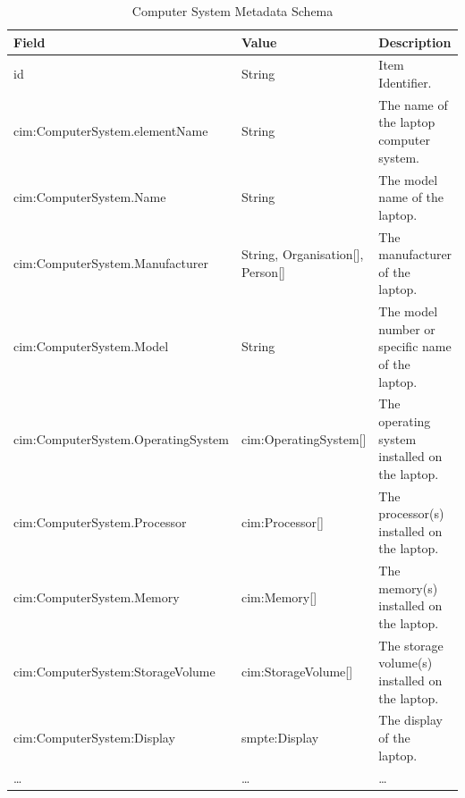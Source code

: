 \begin{longtable}{|p{}|p{}|p{}|}
    \caption{Computer System Metadata Schema} \label{tab:c4-computer} \\
    \hline
    \textbf{Field} & \textbf{Value} & \textbf{Description} \\
    \hline

    \scriptsize id                                    & \scriptsize String                         & \scriptsize Item Identifier. \\
    \hline
    \scriptsize cim:ComputerSystem.elementName        & \scriptsize String                         & \scriptsize The name of the laptop computer system. \\
    \hline
    \scriptsize cim:ComputerSystem.Name               & \scriptsize String                         & \scriptsize The model name of the laptop. \\
    \hline
    \scriptsize cim:ComputerSystem.Manufacturer       & \scriptsize String, \textcolor{uniudColor3}{Organisation}[], \textcolor{uniudColor3}{Person}[]     & \scriptsize The manufacturer of the laptop. \\
    \hline
    \scriptsize cim:ComputerSystem.Model              & \scriptsize String                         & \scriptsize The model number or specific name of the laptop. \\
    \hline
    \scriptsize cim:ComputerSystem.OperatingSystem    & \scriptsize \textcolor{uniudColor3}{cim:OperatingSystem}[]          & \scriptsize The operating system installed on the laptop. \\
    \hline
    \scriptsize cim:ComputerSystem.Processor          & \scriptsize \textcolor{uniudColor3}{cim:Processor}[]                & \scriptsize The processor(s) installed on the laptop. \\
    \hline
    \scriptsize cim:ComputerSystem.Memory             & \scriptsize \textcolor{uniudColor3}{cim:Memory}[]                   & \scriptsize The memory(s) installed on the laptop. \\
    \hline
    \scriptsize cim:ComputerSystem:StorageVolume      & \scriptsize \textcolor{uniudColor3}{cim:StorageVolume}[]            & \scriptsize The storage volume(s) installed on the laptop. \\
    \hline
    \scriptsize cim:ComputerSystem:Display            & \scriptsize \textcolor{uniudColor3}{smpte:Display}                  & \scriptsize The display of the laptop. \\
    \hline
    \scriptsize …                                     & \scriptsize …                              & \scriptsize … \\
    \hline

\end{longtable}

